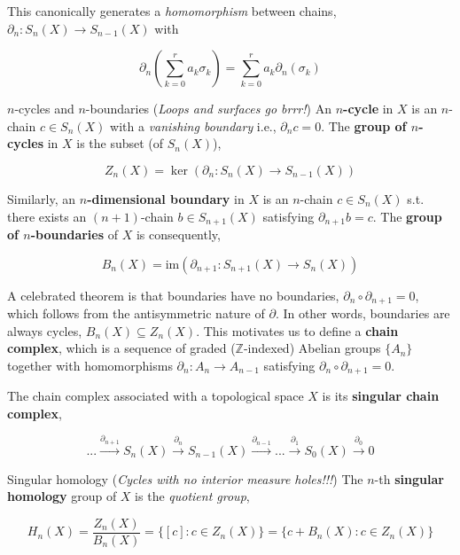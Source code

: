 \documentclass[final]{beamer}
\newenvironment{highlight}
{\begin{tcolorbox}[colback=lightblue, boxrule=0pt, frame empty]}
{\end{tcolorbox}}
\newlength{\colwidth}
\newcommand{\im}{\text{im}}
\newcommand{\mor}[1]{\xrightarrow{#1}}
\theoremstyle{remark}
\begin{document}
\begin{frame}[t]
\begin{columns}[t]
\begin{column}{\colwidth}
This canonically generates a \emph{homomorphism} between chains, $\partial_n : S_n(X) \to S_{n-1}(X)$ with

$$\partial_n \left( \sum_{k=0}^r a_k \sigma_k \right) = \sum_{k=0}^r a_k \partial_n(\sigma_k)$$

\begin{alertblock}{$n$-cycles and $n$-boundaries (\emph{Loops and surfaces go brrr!})}
An \textbf{$n$-cycle} in $X$ is an $n$-chain $c \in S_n(X)$ with a \emph{vanishing boundary} i.e., $\partial_n c = 0$. The \textbf{group of $n$-cycles} in $X$ is the subset (of $S_n(X)$),

$$Z_n(X) = \ker(\partial_n : S_n(X) \to S_{n-1}(X))$$

Similarly, an \textbf{$n$-dimensional boundary} in $X$ is an $n$-chain $c \in S_n(X)$ s.t. there exists an $(n+1)$-chain $b \in S_{n+1}(X)$ satisfying $\partial_{n+1} b = c$. The \textbf{group of $n$-boundaries} of $X$ is consequently, 

$$B_n(X) = \im(\partial_{n+1} : S_{n+1}(X) \to S_n(X))$$
\end{alertblock}

A celebrated theorem is that boundaries have no boundaries, $\partial_{n} \circ \partial_{n+1} = 0$, which follows from the antisymmetric nature of $\partial$. In other words, boundaries are always cycles, $B_n(X) \subseteq Z_n(X)$. This motivates us to define a \textbf{chain complex}, which is a sequence of graded ($\mathbb{Z}$-indexed) Abelian groups $\{ A_n \}$ together with homomorphisms $\partial_n : A_n \to A_{n-1}$ satisfying $\partial_n \circ \partial_{n+1} = 0$.

The chain complex associated with a topological space $X$ is its \textbf{singular chain complex},

\begin{highlight}
$$... \mor{\partial_{n+1}} S_n(X) \mor{\partial_n} S_{n-1}(X) \mor{\partial_{n-1}} ... \mor{\partial_1} S_0(X) \mor{\partial_0} 0$$
\end{highlight}

\begin{block}{Singular homology (\emph{Cycles with no interior measure holes!!!})}
The $n$-th \textbf{singular homology} group of $X$ is the \emph{quotient group},

\begin{highlight}
$$H_n(X) = \frac{Z_n(X)}{B_n(X)} = \{ [c] : c \in Z_n(X) \} = \{ c + B_n(X) : c \in Z_n(X) \}$$
\end{highlight}


\end{block}
\end{column}
\end{columns}
\end{frame}
\end{document}
